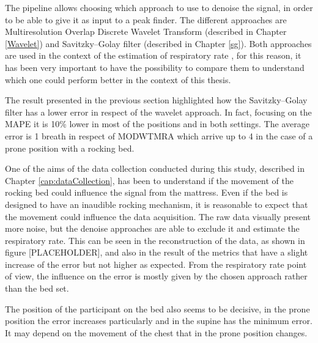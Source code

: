 The pipeline allows choosing which approach to use to denoise the signal, in order to be able to give it as input to a peak finder. The different approaches are Multiresolution Overlap Discrete Wavelet Transform (described in Chapter \ref{Wavelet}) and Savitzky–Golay filter (described in Chapter \ref{sg}).
Both approaches are used in the context of the estimation of respiratory rate \cite{Sadek2017NonintrusiveStudy, Chen2008UnconstrainedSleep}, for this reason, it has been very important to have the possibility to compare them to understand which one could perform better in the context of this thesis.

The result presented in the previous section highlighted how the Savitzky–Golay filter has a lower error in respect of the wavelet approach. In fact, focusing on the MAPE it is 10\% lower in most of the positions and in both settings. The average error is 1 breath in respect of MODWTMRA which arrive up to 4 in the case of a prone position with a rocking bed.



One of the aims of the data collection conducted during this study, described in Chapter \ref{cap:dataCollection}, has been to understand if the movement of the rocking bed could influence the signal from the mattress.
Even if the bed is designed to have an inaudible rocking mechanism, it is reasonable to expect that the movement could influence the data acquisition. The raw data visually present more noise, but the denoise approaches are able to exclude it and estimate the respiratory rate.
This can be seen in the reconstruction of the data, as shown in figure [PLACEHOLDER], and also in the result of the metrics that have a slight increase of the error but not higher as expected.
From the respiratory rate point of view, the influence on the error is mostly given by the chosen approach rather than the bed set. 

The position of the participant on the bed also seems to be decisive, in the prone position the error increases particularly and in the supine has the minimum error. It may depend on the movement of the chest that in the prone position changes.\\


